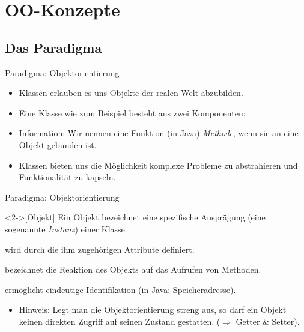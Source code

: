 
\section{OO-Konzepte}

\subsection{Das Paradigma}
\begin{frame}{Paradigma: Objektorientierung}
    \begin{itemize}[<+(1)->]
        \item Klassen erlauben es uns Objekte der realen Welt abzubilden.
        \item Eine Klasse wie zum Beispiel  besteht aus zwei Komponenten: 
        \item Information:\pause{} Wir nennen eine Funktion (in Java) \emph{Methode}, wenn sie an eine Objekt gebunden ist.
        \item Klassen bieten uns die Möglichkeit komplexe Probleme zu abstrahieren und Funktionalität zu kapseln.
    \end{itemize}
\end{frame}

\begin{frame}{Paradigma: Objektorientierung}
    \begin{definition}<2->[Objekt]
        Ein Objekt bezeichnet eine spezifische Ausprägung (eine sogenannte \emph{Instanz}) einer Klasse. \begin{description}
            \item[Objektzustand] wird durch die ihm zugehörigen Attribute definiert.
            \item[Objektverhalten] bezeichnet die Reaktion des Objekts auf das Aufrufen von Methoden.
            \item[Objektidentität] ermöglicht eindeutige Identifikation (in Java: Speicheradresse).
        \end{description}
    \end{definition}
    \begin{itemize}[<+(1)->]
        \item Hinweis:\pause{} Legt man die Objektorientierung streng aus,\pause{} so darf ein Objekt keinen direkten Zugriff auf seinen Zustand gestatten.\pause{} (\(\Rightarrow\) Getter \& Setter).
    \end{itemize}
\end{frame}

